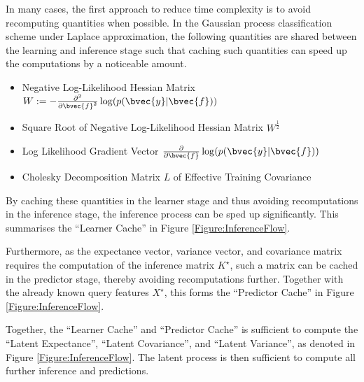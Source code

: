 			In many cases, the first approach to reduce time complexity is to avoid recomputing quantities when possible. In the Gaussian process classification scheme under Laplace approximation, the following quantities are shared between the learning and inference stage such that caching such quantities can speed up the computations by a noticeable amount.
			
			\begin{itemize}
				\item Negative Log-Likelihood Hessian Matrix $W := -\frac{\partial^{2}}{{\partial \bvec{f}}^{2}} \log(p(\bvec{y} | \bvec{f}))$
				\item Square Root of Negative Log-Likelihood Hessian Matrix $W^{\frac{1}{2}}$
				\item Log Likelihood Gradient Vector $\frac{\partial}{\partial \bvec{f}} \log(p(\bvec{y} | \bvec{f}))$
				\item Cholesky Decomposition Matrix $L$ of Effective Training Covariance
			\end{itemize}

			By caching these quantities in the learner stage and thus avoiding recomputations in the inference stage, the inference process can be sped up significantly. This summarises the ``Learner Cache'' in Figure \ref{Figure:InferenceFlow}.
			
			Furthermore, as the expectance vector, variance vector, and covariance matrix requires the computation of the inference matrix $K^{\star}$, such a matrix can be cached in the predictor stage, thereby avoiding recomputations further. Together with the already known query features $X^{\star}$, this forms the ``Predictor Cache'' in Figure \ref{Figure:InferenceFlow}.
			
			Together, the ``Learner Cache'' and ``Predictor Cache'' is sufficient to compute the ``Latent Expectance'', ``Latent Covariance'', and ``Latent Variance'', as denoted in Figure \ref{Figure:InferenceFlow}. The latent process is then sufficient to compute all further inference and predictions.
		

		
			
		
		